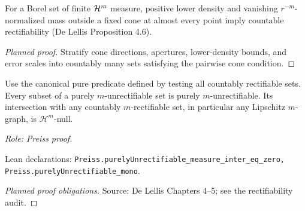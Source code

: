 \begin{lemma}
\label{lem:cone-criterion}








For a Borel set of finite $\mathcal H^m$ measure, positive lower density and
vanishing $r^{-m}$-normalized mass outside a fixed cone at almost every point
imply countable rectifiability (De Lellis Proposition 4.6).
\end{lemma}
\begin{proof}[Planned proof]

Stratify cone directions, apertures, lower-density bounds, and error scales
into countably many sets satisfying the pairwise cone condition.
\end{proof}

\begin{lemma}
\label{lem:pure-basic}








Use the canonical pure predicate defined by testing all countably rectifiable sets.
Every subset of a purely \(m\)-unrectifiable set is purely \(m\)-unrectifiable. Its intersection with any countably \(m\)-rectifiable set, in particular any Lipschitz \(m\)-graph, is \(\mathcal H^m\)-null.
\par\emph{Role: Preiss proof.}
\par Lean declarations: \texttt{Preiss.purelyUnrectifiable\_measure\_inter\_eq\_zero, Preiss.purelyUnrectifiable\_mono}.
\end{lemma}
\begin{proof}[Planned proof obligations]

\par Source: De Lellis Chapters 4--5; see the rectifiability audit.
\end{proof}

